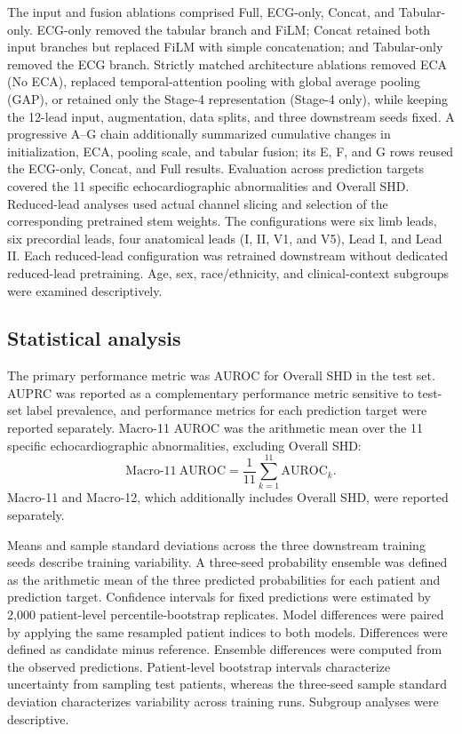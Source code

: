 The input and fusion ablations comprised Full, ECG-only, Concat, and Tabular-only. ECG-only removed the tabular branch and FiLM; Concat retained both input branches but replaced FiLM with simple concatenation; and Tabular-only removed the ECG branch. Strictly matched architecture ablations removed ECA (No ECA), replaced temporal-attention pooling with global average pooling (GAP), or retained only the Stage-4 representation (Stage-4 only), while keeping the 12-lead input, augmentation, data splits, and three downstream seeds fixed. A progressive A--G chain additionally summarized cumulative changes in initialization, ECA, pooling scale, and tabular fusion; its E, F, and G rows reused the ECG-only, Concat, and Full results. Evaluation across prediction targets covered the 11 specific echocardiographic abnormalities and Overall SHD. Reduced-lead analyses used actual channel slicing and selection of the corresponding pretrained stem weights. The configurations were six limb leads, six precordial leads, four anatomical leads (I, II, V1, and V5), Lead I, and Lead II. Each reduced-lead configuration was retrained downstream without dedicated reduced-lead pretraining. Age, sex, race/ethnicity, and clinical-context subgroups were examined descriptively.

\subsection{Statistical analysis}
\label{sec:statistics}

The primary performance metric was AUROC for Overall SHD in the test set. AUPRC was reported as a complementary performance metric sensitive to test-set label prevalence, and performance metrics for each prediction target were reported separately. Macro-11 AUROC was the arithmetic mean over the 11 specific echocardiographic abnormalities, excluding Overall SHD:
\begin{equation}
\mathrm{Macro\mbox{-}11\ AUROC}=\frac{1}{11}
\sum_{k=1}^{11}\mathrm{AUROC}_k.
\label{eq:macro11}
\end{equation}
Macro-11 and Macro-12, which additionally includes Overall SHD, were reported separately.

Means and sample standard deviations across the three downstream training seeds describe training variability. A three-seed probability ensemble was defined as the arithmetic mean of the three predicted probabilities for each patient and prediction target. Confidence intervals for fixed predictions were estimated by 2,000 patient-level percentile-bootstrap replicates. Model differences were paired by applying the same resampled patient indices to both models. Differences were defined as candidate minus reference. Ensemble differences were computed from the observed predictions. Patient-level bootstrap intervals characterize uncertainty from sampling test patients, whereas the three-seed sample standard deviation characterizes variability across training runs. Subgroup analyses were descriptive.

